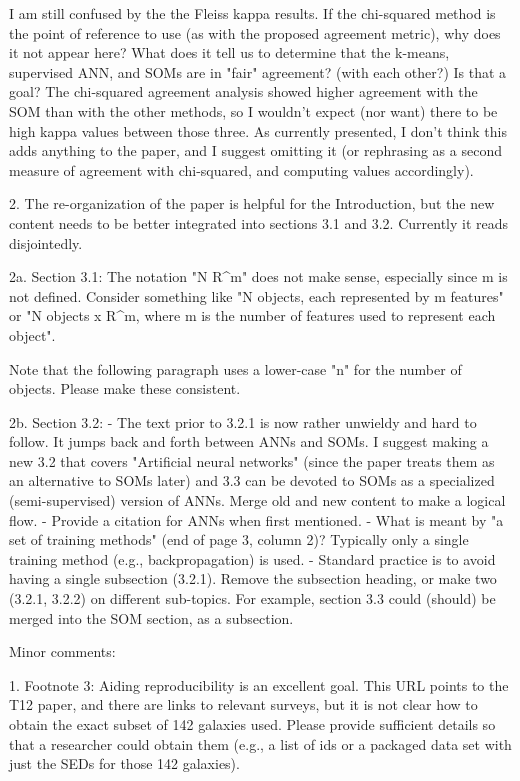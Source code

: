 I am still confused by the the Fleiss kappa results.  If the chi-squared method is the point of reference to use (as with the proposed agreement metric), why does it not appear here?  What does it tell us to determine that the k-means, supervised ANN, and SOMs are in "fair" agreement? (with each other?)  Is that a goal?  The chi-squared agreement analysis showed higher agreement with the SOM than with the other methods, so I wouldn't expect (nor want) there to be high kappa values between those three.  As currently presented, I don't think this adds anything to the paper, and I suggest omitting it (or rephrasing as a second measure of agreement with chi-squared, and computing values accordingly).

2. The re-organization of the paper is helpful for the Introduction, but the new content needs to be better integrated into sections 3.1 and 3.2.  Currently it reads disjointedly.

2a. Section 3.1: The notation "N \in R^m" does not make sense, especially since m is not defined.  Consider something like "N objects, each represented by m features" or "N objects x \in R^m, where m is the number of features used to represent each object".

Note that the following paragraph uses a lower-case "n" for the number of objects.  Please make these consistent.

2b. Section 3.2:
- The text prior to 3.2.1 is now rather unwieldy and hard to follow.  It jumps back and forth between ANNs and SOMs. I suggest making a new 3.2 that covers "Artificial neural networks" (since the paper treats them as an alternative to SOMs later) and 3.3 can be devoted to SOMs as a specialized (semi-supervised) version of ANNs.  Merge old and new content to make a logical flow.
- Provide a citation for ANNs when first mentioned.
- What is meant by "a set of training methods" (end of page 3, column 2)?  Typically only a single training method (e.g., backpropagation) is used.
- Standard practice is to avoid having a single subsection (3.2.1). Remove the subsection heading, or make two (3.2.1, 3.2.2) on different sub-topics.  For example, section 3.3 could (should) be merged into the SOM section, as a subsection.

Minor comments:

1. Footnote 3: Aiding reproducibility is an excellent goal.  This URL points to the T12 paper, and there are links to relevant surveys, but it is not clear how to obtain the exact subset of 142 galaxies used. Please provide sufficient details so that a researcher could obtain them (e.g., a list of ids or a packaged data set with just the SEDs for those 142 galaxies).

